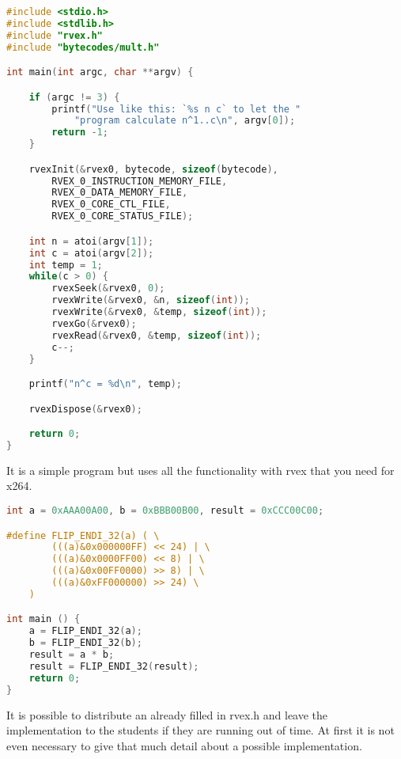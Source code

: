\begin{lstlisting}[language=C,style=C,caption=pow - Microblaze part,label=lst:pow-microblaze]
#include <stdio.h>
#include <stdlib.h>
#include "rvex.h"
#include "bytecodes/mult.h"

int main(int argc, char **argv) {

	if (argc != 3) {
		printf("Use like this: `%s n c` to let the "
			"program calculate n^1..c\n", argv[0]);
		return -1;
	}

	rvexInit(&rvex0, bytecode, sizeof(bytecode),
		RVEX_0_INSTRUCTION_MEMORY_FILE,
		RVEX_0_DATA_MEMORY_FILE,
		RVEX_0_CORE_CTL_FILE,
		RVEX_0_CORE_STATUS_FILE);

	int n = atoi(argv[1]);
	int c = atoi(argv[2]);
	int temp = 1;
	while(c > 0) {
		rvexSeek(&rvex0, 0);
		rvexWrite(&rvex0, &n, sizeof(int));
		rvexWrite(&rvex0, &temp, sizeof(int));
		rvexGo(&rvex0);
		rvexRead(&rvex0, &temp, sizeof(int));
		c--;
	}

	printf("n^c = %d\n", temp);

	rvexDispose(&rvex0);

	return 0;
}
\end{lstlisting}

It is a simple program but uses all the functionality with rvex that you need for x264.

\begin{lstlisting}[language=C,style=C,caption=pow - kernel part,label=lst:pow-kernel]
int a = 0xAAA00A00, b = 0xBBB00B00, result = 0xCCC00C00;

#define FLIP_ENDI_32(a) ( \
		(((a)&0x000000FF) << 24) | \
		(((a)&0x0000FF00) << 8) | \
		(((a)&0x00FF0000) >> 8) | \
		(((a)&0xFF000000) >> 24) \
	)

int main () {
	a = FLIP_ENDI_32(a);
	b = FLIP_ENDI_32(b);
	result = a * b;
	result = FLIP_ENDI_32(result);
	return 0;
}
\end{lstlisting}

It is possible to distribute an already filled in rvex.h and leave the implementation to the students if they are running out of time.
At first it is not even necessary to give that much detail about a possible implementation.
